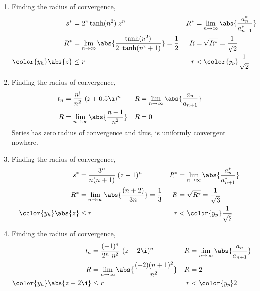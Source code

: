 \begin{enumerate}
    \item Finding the radius of convergence,
          \begin{align}
              s^*           & = 2^n \tanh(n^2)\ z^n                        &
              R^*           & = \lim_{n \to \infty} \abs{\frac{a^*_{n}}
              {a^*_{n+1}}}                                                   \\
              R^*           & = \lim_{n \to \infty} \abs{\frac{\tanh(n^2)}
                  {2\ \tanh(n^2 + 1)}}
              = \frac{1}{2} &
              R             & = \sqrt{R^*} = \frac{1}{\sqrt{2}}              \\
              \color{y_h}
              \abs{z}       & \leq r                                       &
              r             & < \color{y_p} \frac{1}{\sqrt{2}}
          \end{align}

    \item Finding the radius of convergence,
          \begin{align}
              t_n & = \frac{n!}{n^2}\ (z + 0.5\i)^n                   &
              R   & = \lim_{n \to \infty} \abs{\frac{a_{n}}{a_{n+1}}}   \\
              R   & = \lim_{n \to \infty} \abs{\frac{n+1}{n^2}}       &
              R   & = 0
          \end{align}
          Series has zero radius of convergence and thus, is uniformly convergent
          nowhere.

    \item Finding the radius of convergence,
          \begin{align}
              s^*           & = \frac{3^n}{n(n+1)} \ (z-1)^n               &
              R^*           & = \lim_{n \to \infty} \abs{\frac{a^*_{n}}
              {a^*_{n+1}}}                                                   \\
              R^*           & = \lim_{n \to \infty} \abs{\frac{(n+2)}{3n}}
              = \frac{1}{3} &
              R             & = \sqrt{R^*} = \frac{1}{\sqrt{3}}              \\
              \color{y_h}
              \abs{z}       & \leq r                                       &
              r             & < \color{y_p} \frac{1}{\sqrt{3}}
          \end{align}

    \item Finding the radius of convergence,
          \begin{align}
              t_n           & = \frac{(-1)^n}{2^n\ n^2}\ (z - 2\i)^n              &
              R             & = \lim_{n \to \infty} \abs{\frac{a_{n}}{a_{n+1}}}     \\
              R             & = \lim_{n \to \infty} \abs{\frac{(-2)(n+1)^2}{n^2}} &
              R             & = 2                                                   \\
              \color{y_h}
              \abs{z - 2\i} & \leq r                                              &
              r             & < \color{y_p} 2
          \end{align}


\end{enumerate}
